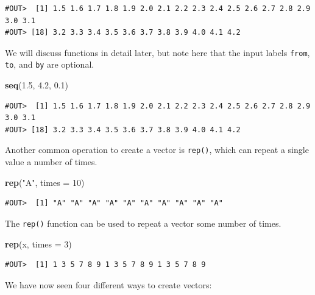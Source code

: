 \documentclass[]{book}
\newenvironment{Shaded}{\begin{snugshade}}{\end{snugshade}}
\newcommand{\KeywordTok}[1]{\textcolor[rgb]{0.13,0.29,0.53}{\textbf{#1}}}
\newcommand{\DataTypeTok}[1]{\textcolor[rgb]{0.13,0.29,0.53}{#1}}
\newcommand{\DecValTok}[1]{\textcolor[rgb]{0.00,0.00,0.81}{#1}}
\newcommand{\FloatTok}[1]{\textcolor[rgb]{0.00,0.00,0.81}{#1}}
\newcommand{\StringTok}[1]{\textcolor[rgb]{0.31,0.60,0.02}{#1}}
\newcommand{\NormalTok}[1]{#1}
\theoremstyle{definition}
\theoremstyle{definition}
\theoremstyle{definition}
\theoremstyle{remark}
\begin{document}
\begin{verbatim}
#OUT>  [1] 1.5 1.6 1.7 1.8 1.9 2.0 2.1 2.2 2.3 2.4 2.5 2.6 2.7 2.8 2.9 3.0 3.1
#OUT> [18] 3.2 3.3 3.4 3.5 3.6 3.7 3.8 3.9 4.0 4.1 4.2
\end{verbatim}

We will discuss functions in detail later, but note here that the input
labels \texttt{from}, \texttt{to}, and \texttt{by} are optional.

\begin{Shaded}
\begin{Highlighting}[]
\KeywordTok{seq}\NormalTok{(}\FloatTok{1.5}\NormalTok{, }\FloatTok{4.2}\NormalTok{, }\FloatTok{0.1}\NormalTok{)}
\end{Highlighting}
\end{Shaded}

\begin{verbatim}
#OUT>  [1] 1.5 1.6 1.7 1.8 1.9 2.0 2.1 2.2 2.3 2.4 2.5 2.6 2.7 2.8 2.9 3.0 3.1
#OUT> [18] 3.2 3.3 3.4 3.5 3.6 3.7 3.8 3.9 4.0 4.1 4.2
\end{verbatim}

Another common operation to create a vector is \texttt{rep()}, which can
repeat a single value a number of times.

\begin{Shaded}
\begin{Highlighting}[]
\KeywordTok{rep}\NormalTok{(}\StringTok{"A"}\NormalTok{, }\DataTypeTok{times =} \DecValTok{10}\NormalTok{)}
\end{Highlighting}
\end{Shaded}

\begin{verbatim}
#OUT>  [1] "A" "A" "A" "A" "A" "A" "A" "A" "A" "A"
\end{verbatim}

The \texttt{rep()} function can be used to repeat a vector some number
of times.

\begin{Shaded}
\begin{Highlighting}[]
\KeywordTok{rep}\NormalTok{(x, }\DataTypeTok{times =} \DecValTok{3}\NormalTok{)}
\end{Highlighting}
\end{Shaded}

\begin{verbatim}
#OUT>  [1] 1 3 5 7 8 9 1 3 5 7 8 9 1 3 5 7 8 9
\end{verbatim}

We have now seen four different ways to create vectors:
\end{document}
